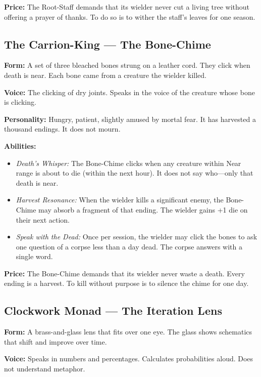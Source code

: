 \noindent\textbf{Price:} The Root-Staff demands that its wielder never cut a living tree without offering a prayer of thanks. To do so is to wither the staff's leaves for one season.

\subsection{The Carrion-King — The Bone-Chime}

\noindent\textbf{Form:} A set of three bleached bones strung on a leather cord. They click when death is near. Each bone came from a creature the wielder killed.

\noindent\textbf{Voice:} The clicking of dry joints. Speaks in the voice of the creature whose bone is clicking.

\noindent\textbf{Personality:} Hungry, patient, slightly amused by mortal fear. It has harvested a thousand endings. It does not mourn.

\noindent\textbf{Abilities:}
\begin{itemize}
\item \textit{Death's Whisper:} The Bone-Chime clicks when any creature within Near range is about to die (within the next hour). It does not say who—only that death is near.
\item \textit{Harvest Resonance:} When the wielder kills a significant enemy, the Bone-Chime may absorb a fragment of that ending. The wielder gains +1 die on their next action.
\item \textit{Speak with the Dead:} Once per session, the wielder may click the bones to ask one question of a corpse less than a day dead. The corpse answers with a single word.
\end{itemize}

\noindent\textbf{Price:} The Bone-Chime demands that its wielder never waste a death. Every ending is a harvest. To kill without purpose is to silence the chime for one day.

\subsection{Clockwork Monad — The Iteration Lens}

\noindent\textbf{Form:} A brass-and-glass lens that fits over one eye. The glass shows schematics that shift and improve over time.

\noindent\textbf{Voice:} Speaks in numbers and percentages. Calculates probabilities aloud. Does not understand metaphor.

